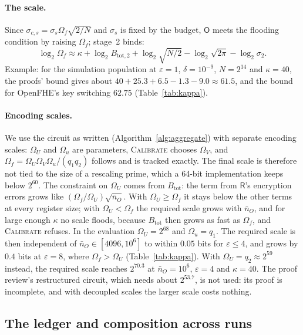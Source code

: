 \documentclass[11pt]{article}
\theoremstyle{definition}
\theoremstyle{plain}
\newcommand{\Party}[1]{\textsf{#1}}
\newcommand{\Rp}{\Party{R}}
\newcommand{\Op}{\Party{O}}
\begin{document}
\paragraph{The scale.} Since $\sigma_{c,s} = \sigma_s\Omega_f\sqrt{2/N}$ and $\sigma_s$ is fixed by the budget, $\Op$ meets the flooding condition by raising $\Omega_f$; stage~2 binds:
\[
  \log_2\Omega_f \approx \kappa + \log_2 B_{\mathrm{tot},2} + \log_2\sqrt{N/2} - \log_2\sqrt{2\pi} - \log_2\sigma_2 .
\]
Example: for the simulation population at $\varepsilon = 1$, $\delta = 10^{-9}$, $N = 2^{14}$ and $\kappa = 40$, the proofs' bound gives about $40 + 25.3 + 6.5 - 1.3 - 9.0 \approx 61.5$, and the bound for OpenFHE's key switching $62.75$ (Table~\ref{tab:kappa}).

\paragraph{Encoding scales.} We use the circuit as written (Algorithm~\ref{alg:aggregate}) with separate encoding scales: $\Omega_U$ and $\Omega_u$ are parameters, \textsc{Calibrate} chooses $\Omega_V$, and $\Omega_f = \Omega_U\Omega_V\Omega_u/(q_1q_2)$ follows and is tracked exactly. The final scale is therefore not tied to the size of a rescaling prime, which a 64-bit implementation keeps below $2^{60}$. The constraint on $\Omega_U$ comes from $B_{\mathrm{tot}}$: the term from $\Rp$'s encryption errors grows like $(\Omega_f/\Omega_U)\sqrt{\bar n_O}$. With $\Omega_U \ge \Omega_f$ it stays below the other terms at every register size; with $\Omega_U < \Omega_f$ the required scale grows with $\bar n_O$, and for large enough $\kappa$ no scale floods, because $B_{\mathrm{tot}}$ then grows as fast as $\Omega_f$, and \textsc{Calibrate} refuses. In the evaluation $\Omega_U = 2^{68}$ and $\Omega_u = q_1$. The required scale is then independent of $\bar n_O \in [4096, 10^6]$ to within $0.05$ bits for $\varepsilon \le 4$, and grows by $0.4$ bits at $\varepsilon = 8$, where $\Omega_f > \Omega_U$ (Table~\ref{tab:kappa}). With $\Omega_U = q_2 \approx 2^{59}$ instead, the required scale reaches $2^{70.3}$ at $\bar n_O = 10^6$, $\varepsilon = 4$ and $\kappa = 40$. The proof review's restructured circuit, which needs about $2^{53.7}$, is not used: its proof is incomplete, and with decoupled scales the larger scale costs nothing.

\subsection{The ledger and composition across runs}
\label{sec:privacy:ledger}
\end{document}
